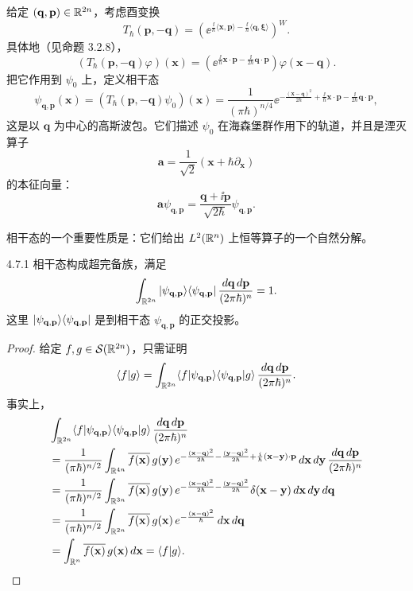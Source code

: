 给定 $(\mathbf q,\mathbf p)\in\mathbb{R}^{2n}$，考虑酉变换
\[
T_{\hbar}(\mathbf p,-\mathbf q)
=\left(\ee^{\frac{\ii}{\hbar}\langle\mathbf x,\mathbf p\rangle-\frac{\ii}{\hbar}\langle\mathbf q,\boldsymbol\xi\rangle}\right)^W.
\]
具体地（见命题 3.2.8），
\[
(T_{\hbar}(\mathbf p,-\mathbf q)\varphi)(\mathbf x)
=\left(\ee^{\frac{\ii}{\hbar}\mathbf x\cdot\mathbf p-\frac{\ii}{2\hbar}\mathbf q\cdot\mathbf p}\right)\varphi(\mathbf x-\mathbf q).
\]
把它作用到 $\psi_0$ 上，定义相干态
\[
\psi_{\mathbf q,\mathbf p}(\mathbf x)
=(T_{\hbar}(\mathbf p,-\mathbf q)\psi_0)(\mathbf x)
=\frac{1}{(\pi\hbar)^{n/4}}
\ee^{-\frac{(\mathbf x-\mathbf q)^2}{2\hbar}+\frac{\ii}{\hbar}\mathbf x\cdot\mathbf p-\frac{\ii}{2\hbar}\mathbf q\cdot\mathbf p},
\]
这是以 $\mathbf q$ 为中心的高斯波包。它们描述 $\psi_0$ 在海森堡群作用下的轨道，并且是湮灭算子
\[
\mathbf a=\frac{1}{\sqrt2}(\mathbf x+\hbar\partial_{\mathbf x})
\]
的本征向量：
\[
\mathbf a\psi_{\mathbf q,\mathbf p}=\frac{\mathbf q+\ii\mathbf p}{\sqrt{2\hbar}}\psi_{\mathbf q,\mathbf p}.
\]

相干态的一个重要性质是：它们给出 $L^2(\mathbb{R}^n)$ 上恒等算子的一个自然分解。

\begin{proposition}{4.7.1}
  相干态构成超完备族，满足
  \[
  \int_{\mathbb{R}^{2n}}|\psi_{\mathbf q,\mathbf p}\rangle\langle \psi_{\mathbf q,\mathbf p}|\,
  \frac{d\mathbf q\,d\mathbf p}{(2\pi\hbar)^n}=1.
  \]
  这里 $|\psi_{\mathbf q,\mathbf p}\rangle\langle \psi_{\mathbf q,\mathbf p}|$ 是到相干态
  $\psi_{\mathbf q,\mathbf p}$ 的正交投影。
\end{proposition}

\begin{proof}
给定 $f,g\in\mathcal S(\mathbb{R}^{2n})$，只需证明
\[
\langle f|g\rangle
=\int_{\mathbb{R}^{2n}}\langle f|\psi_{\mathbf q,\mathbf p}\rangle
\langle \psi_{\mathbf q,\mathbf p}|g\rangle\,
\frac{d\mathbf q\,d\mathbf p}{(2\pi\hbar)^n}.
\]
事实上，
\begin{align*}
&\int_{\mathbb{R}^{2n}}\langle f|\psi_{\mathbf q,\mathbf p}\rangle
\langle \psi_{\mathbf q,\mathbf p}|g\rangle\,
\frac{d\mathbf q\,d\mathbf p}{(2\pi\hbar)^n}\\
&=\frac{1}{(\pi\hbar)^{n/2}}\int_{\mathbb{R}^{4n}}\overline{f(\mathbf x)}\,g(\mathbf y)\,
e^{-\frac{(\mathbf x-\mathbf q)^2}{2\hbar}-\frac{(\mathbf y-\mathbf q)^2}{2\hbar}
+\frac{i}{\hbar}(\mathbf x-\mathbf y)\cdot\mathbf p}
\,d\mathbf x\,d\mathbf y\,\frac{d\mathbf q\,d\mathbf p}{(2\pi\hbar)^n}\\
&=\frac{1}{(\pi\hbar)^{n/2}}\int_{\mathbb{R}^{3n}}\overline{f(\mathbf x)}\,g(\mathbf y)\,
e^{-\frac{(\mathbf x-\mathbf q)^2}{2\hbar}-\frac{(\mathbf y-\mathbf q)^2}{2\hbar}}
\delta(\mathbf x-\mathbf y)\,d\mathbf x\,d\mathbf y\,d\mathbf q\\
&=\frac{1}{(\pi\hbar)^{n/2}}\int_{\mathbb{R}^{2n}}\overline{f(\mathbf x)}\,g(\mathbf x)\,
e^{-\frac{(\mathbf x-\mathbf q)^2}{\hbar}}\,d\mathbf x\,d\mathbf q\\
&=\int_{\mathbb{R}^n}\overline{f(\mathbf x)}\,g(\mathbf x)\,d\mathbf x=\langle f|g\rangle.
\end{align*}
\end{proof}


